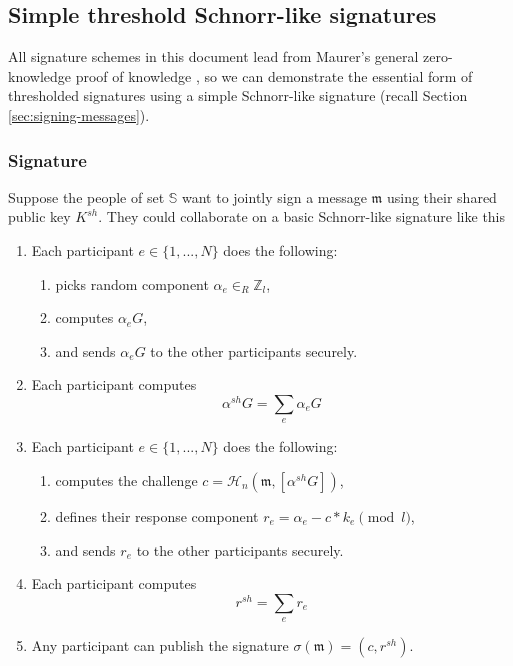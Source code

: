 \subsection{Simple threshold Schnorr-like signatures}
\label{sec:simple-threshold-schnorr}

All signature schemes in this document lead from Maurer's general zero-knowledge proof of knowledge \cite{simple-zk-proof-maurer}, so we can demonstrate the essential form of thresholded signatures using a simple Schnorr-like signature (recall Section \ref{sec:signing-messages}).

\subsubsection*{Signature}

Suppose the people of set $\mathbb{S}$ want to jointly sign a message $\mathfrak{m}$ using their shared public key $K^{sh}$. They could collaborate on a basic Schnorr-like signature like this

\begin{enumerate}
    \item Each participant $e \in \{1,...,N\}$ does the following:
    \begin{enumerate}
        \item picks random component $\alpha_e \in_R \mathbb{Z}_l$,
        \item computes $\alpha_e G$,
        \item and sends $\alpha_e G$ to the other participants securely.
    \end{enumerate}
    \item Each participant computes 
    \[ \alpha^{sh} G = \sum_e \alpha_e G \]
    \item Each participant $e \in \{1,...,N\}$ does the following:
    \begin{enumerate}
        \item computes the challenge $c = \mathcal{H}_n(\mathfrak{m},[\alpha^{sh} G])$,
        \item defines their response component $r_e = \alpha_e - c* k_e \pmod l$,
        \item and sends $r_e$ to the other participants securely.
    \end{enumerate}
    \item Each participant computes 
    \[ r^{sh} = \sum_e r_e\]
    \item Any participant can publish the signature $\sigma(\mathfrak{m}) = (c,r^{sh})$.
\end{enumerate}

